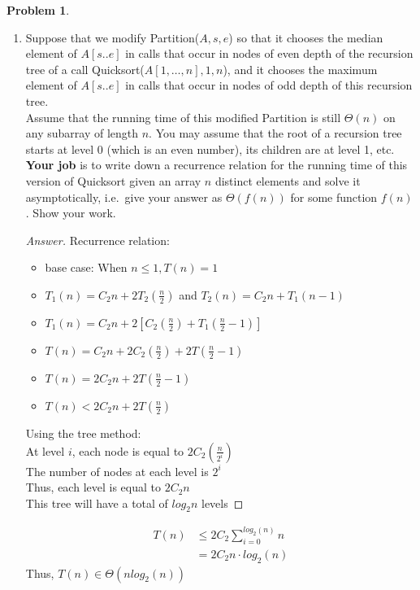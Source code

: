 \documentclass[11pt]{article}
\theoremstyle{definition}
\theoremstyle{definition}
\newtheorem{required}{Problem}
\theoremstyle{definition}
\begin{document}
\begin{required}
\begin{enumerate}[label=(\alph*)]
\item \label{S20c} Suppose that we modify {\sc Partition}($A,s,e$) so that it chooses the median element of $A[s..e]$ in calls that occur in nodes of even depth of the recursion tree of a call {\sc Quicksort}($A[1, \ldots, n],1, n$), and it chooses the maximum element of $A[s..e]$ in calls that occur in nodes of odd depth of this recursion tree. \\
  
\noindent Assume that the running time of this modified {\sc Partition} is still $\Theta(n)$ on any subarray of length $n$. You may assume that the root of a recursion tree starts at level $0$ (which is an even number), its children are at level 1, etc. \\
  
\noindent \textbf{Your job} is to write down a recurrence relation for the running time of this version of {\sc Quicksort} given an array $n$ distinct elements and solve it asymptotically, i.e.\ give your answer as $\Theta(f(n))$ for some function $f(n)$. Show your work.

\begin{proof}[Answer]
Recurrence relation: 
\begin{itemize}
    \item base case: When $n \leq 1, T(n) = 1$
    \item $T_1(n) = C_2n+2T_2(\frac{n}{2})$ and  $T_2(n) = C_2n+T_1(n-1)$
    \item $T_1(n) = C_2n + 2\left[C_2\left(\frac{n}{2}\right) + T_1 \left(\frac{n}{2} -1\right)\right]$
    \item $T(n) = C_2n 
    + 2C_2\left(\frac{n}{2}\right) 
    + 2T \left(\frac{n}{2}- 1\right) $
    \item $T(n) = 
     2C_2n
    + 2T \left(\frac{n}{2} - 1\right)$
    \item $T(n) < 2C_2n + 2T(\frac{n}{2})$
\end{itemize}
Using the tree method:  \\
At level $i$, each node is equal to $2C_2(\frac{n}{2^i})$\\
The number of nodes at each level is $2^i$ \\
Thus, each level is equal to $2C_2n$ \\
This tree will have a total of $log_2n$ levels
\end{proof}
\begin{align*}
    T(n) &\leq 2C_2\sum_{i=0}^{log_2(n)} n \\
    &= 2C_2  n \cdot log_2(n)
\end{align*}
Thus, $T(n) \in \Theta (nlog_2(n))$
\end{enumerate}
\end{required}
\end{document}
